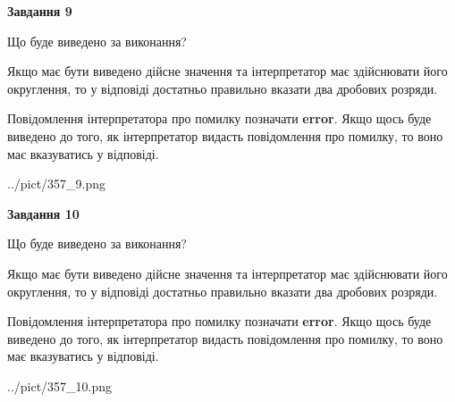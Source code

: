 \documentclass[12pt, ukrainian]{article}
\begin{document}
{\begin {Large}
{\begin {center}\textbf{Завдання 9}\end {center}}\par
Що буде виведено за виконання? \par

Якщо має бути виведено дійсне значення та інтерпретатор має здійснювати його округлення, 
то у відповіді достатньо правильно вказати два дробових розряди.

Повідомлення інтерпретатора про помилку позначати \textbf{error}.
Якщо щось буде виведено до того, як інтерпретатор видасть повідомлення про помилку, 
то воно має вказуватись у відповіді. \par

\begin{center}
	{../pict/357_9.png}
\end{center}
\newpage

{\begin {center}\textbf{Завдання 10}\end {center}}\par
Що буде виведено за виконання? \par

Якщо має бути виведено дійсне значення та інтерпретатор має здійснювати його округлення, 
то у відповіді достатньо правильно вказати два дробових розряди.

Повідомлення інтерпретатора про помилку позначати \textbf{error}.
Якщо щось буде виведено до того, як інтерпретатор видасть повідомлення про помилку, 
то воно має вказуватись у відповіді. \par

\begin{center}
	{../pict/357_10.png}
\end{center}
\newpage

\end {Large}}
\end{document}

